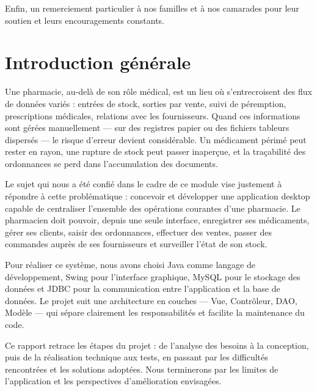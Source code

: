 \documentclass[12pt,a4paper]{report}
\begin{document}
Enfin, un remerciement particulier à nos familles et à nos camarades pour leur soutien et leurs encouragements constants.

\tableofcontents
\thispagestyle{empty}
\newpage

\chapter{Introduction générale}

Une pharmacie, au-delà de son rôle médical, est un lieu où s'entrecroisent des flux de données variés : entrées de stock, sorties par vente, suivi de péremption, prescriptions médicales, relations avec les fournisseurs. Quand ces informations sont gérées manuellement --- sur des registres papier ou des fichiers tableurs dispersés --- le risque d'erreur devient considérable. Un médicament périmé peut rester en rayon, une rupture de stock peut passer inaperçue, et la traçabilité des ordonnances se perd dans l'accumulation des documents.

Le sujet qui nous a été confié dans le cadre de ce module vise justement à répondre à cette problématique : concevoir et développer une application desktop capable de centraliser l'ensemble des opérations courantes d'une pharmacie. Le pharmacien doit pouvoir, depuis une seule interface, enregistrer ses médicaments, gérer ses clients, saisir des ordonnances, effectuer des ventes, passer des commandes auprès de ses fournisseurs et surveiller l'état de son stock.

Pour réaliser ce système, nous avons choisi Java comme langage de développement, Swing pour l'interface graphique, MySQL pour le stockage des données et JDBC pour la communication entre l'application et la base de données. Le projet suit une architecture en couches --- Vue, Contrôleur, DAO, Modèle --- qui sépare clairement les responsabilités et facilite la maintenance du code.

Ce rapport retrace les étapes du projet : de l'analyse des besoins à la conception, puis de la réalisation technique aux tests, en passant par les difficultés rencontrées et les solutions adoptées. Nous terminerons par les limites de l'application et les perspectives d'amélioration envisagées.
\end{document}
